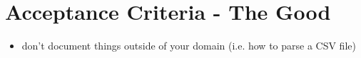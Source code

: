 \section*{Acceptance Criteria - The Good}
\begin{itemize}
\item don't document things outside of your domain (i.e. how to parse a CSV file)
\end{itemize}